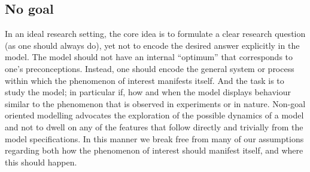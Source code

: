 \subsection{No goal}

In an ideal research setting, the core idea is to formulate a clear research question (as one should always do), yet not to encode the desired answer explicitly in the model. The model should not have an internal “optimum” that corresponds to one’s preconceptions. Instead, one should encode the general system or process within which the phenomenon of interest manifests itself. And the task is to study the model; in particular if, how and when the model displays behaviour similar to the phenomenon that is observed in experiments or in nature. Non-goal oriented modelling advocates the exploration of the possible dynamics of a model and not to dwell on any of the features that follow directly and trivially from the model specifications. In this manner we break free from many of our assumptions regarding both how the phenomenon of interest should manifest itself, and where this should happen.
  